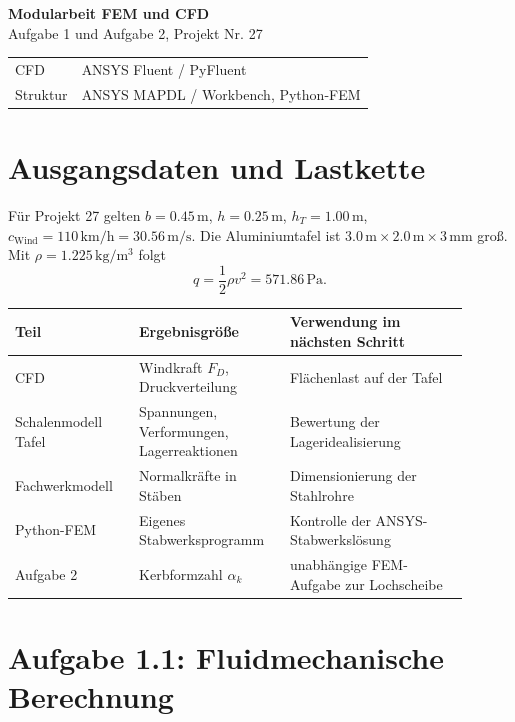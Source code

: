 \documentclass[10pt,a4paper]{article}
\begin{document}
\begin{center}
{\Large\bfseries Modularbeit FEM und CFD}\\
{\large Aufgabe 1 und Aufgabe 2, Projekt Nr. 27}\\
\vspace{0.5mm}
\begin{tabular}{ll}
CFD & ANSYS Fluent / PyFluent\\
Struktur & ANSYS MAPDL / Workbench, Python-FEM\\
\end{tabular}
\end{center}

\section*{Ausgangsdaten und Lastkette}
Für Projekt 27 gelten \(b=0.45\,\mathrm{m}\), \(h=0.25\,\mathrm{m}\), \(h_T=1.00\,\mathrm{m}\), \(c_\mathrm{Wind}=110\,\mathrm{km/h}=30.56\,\mathrm{m/s}\). Die Aluminiumtafel ist \(3.0\,\mathrm{m}\times2.0\,\mathrm{m}\times3\,\mathrm{mm}\) groß. Mit \(\rho=1.225\,\mathrm{kg/m^3}\) folgt
\[
q=\frac12\rho v^2=571.86\,\mathrm{Pa}.
\]
\begin{table}[H]\centering\small
\begin{tabular}{p{0.25\linewidth}p{0.29\linewidth}p{0.36\linewidth}}
\toprule
Teil & Ergebnisgröße & Verwendung im nächsten Schritt\\
\midrule
CFD & Windkraft \(F_D\), Druckverteilung & Flächenlast auf der Tafel\\
Schalenmodell Tafel & Spannungen, Verformungen, Lagerreaktionen & Bewertung der Lageridealisierung\\
Fachwerkmodell & Normalkräfte in Stäben & Dimensionierung der Stahlrohre\\
Python-FEM & Eigenes Stabwerksprogramm & Kontrolle der ANSYS-Stabwerkslösung\\
Aufgabe 2 & Kerbformzahl \(\alpha_k\) & unabhängige FEM-Aufgabe zur Lochscheibe\\
\bottomrule
\end{tabular}
\end{table}

\section{Aufgabe 1.1: Fluidmechanische Berechnung}
\end{document}
